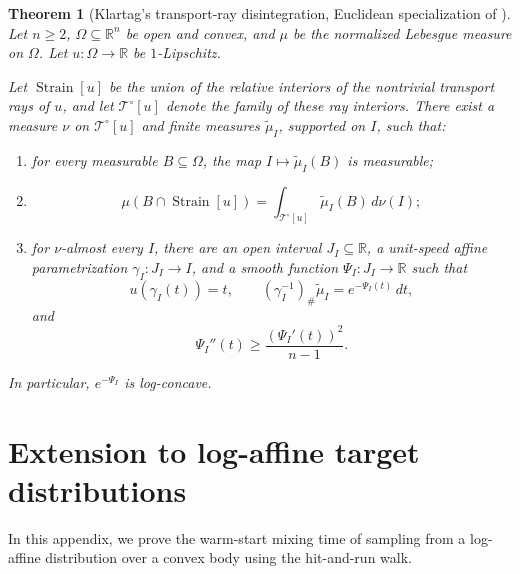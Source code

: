 \documentclass[11pt]{article}
\newtheorem{theorem}{Theorem}[section]
\theoremstyle{definition}
\theoremstyle{remark}
\newcommand{\R}{\mathbb R}
\begin{document}
\begin{theorem}[Klartag's transport-ray disintegration, Euclidean specialization of {\cite[Theorem~1.4]{KlartagNeedles}}]\label{thm:klartag-transport-rays}
Let \(n\ge2\), \(\Omega\subseteq\R^n\) be open and convex, and \(\mu\) be the normalized Lebesgue measure on \(\Omega\).  Let \(u:\Omega\to\R\) be \(1\)-Lipschitz.

Let \(\operatorname{Strain}[u]\) be the union of the relative interiors
of the nontrivial transport rays of \(u\), and let
\(\mathcal T^\circ[u]\) denote the family of these ray interiors.  There
exist a measure \(\nu\) on \(\mathcal T^\circ[u]\) and finite measures
\(\widetilde\mu_I\), supported on \(I\), such that:

\begin{enumerate}[label=\textup{(\roman*)}]

\item for every measurable \(B\subseteq\Omega\), the map $I\longmapsto\widetilde\mu_I(B)$ is measurable;

\item
\begin{equation}\label{eq:klartag-strain-disintegration-clean}
 \mu(B\cap\operatorname{Strain}[u])  =
 \int_{\mathcal T^\circ[u]}
 \widetilde\mu_I(B)\,d\nu(I);
\end{equation}

\item for \(\nu\)-almost every \(I\), there are an open interval
\(J_I\subseteq\R\), a unit-speed affine parametrization
\(\gamma_I:J_I\to I\), and a smooth function
\(\Psi_I:J_I\to\R\) such that
\[
 u(\gamma_I(t))=t,
 \qquad
 (\gamma_I^{-1})_\#\widetilde\mu_I
 =
 e^{-\Psi_I(t)}\,dt,
\]
and
\[
 \Psi_I''(t)
 \ge
 \frac{(\Psi_I'(t))^2}{n-1}.
\]

\end{enumerate}
In particular, \(e^{-\Psi_I}\) is log-concave.
\end{theorem}
\fi


\section{Extension to log-affine target distributions}
\label{app:log-affine}
In this appendix, we prove the warm-start mixing time of sampling from a log-affine distribution over a convex body using the hit-and-run walk.  
\end{document}
